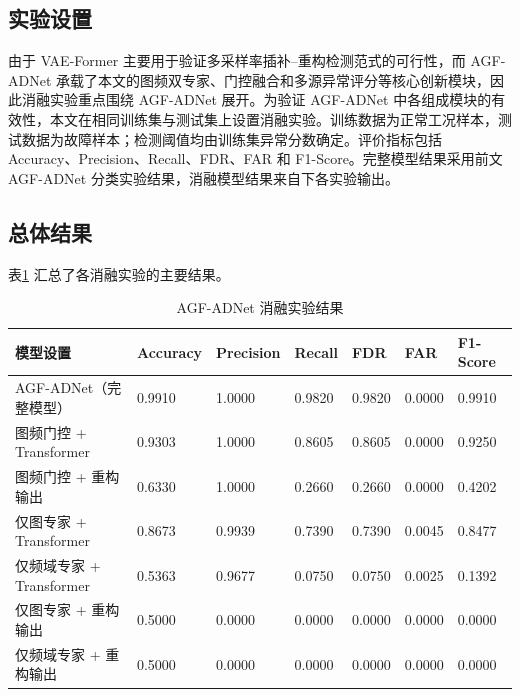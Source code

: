 \documentclass[bachelor, vlined]{DissertUESTC}
\begin{document}
    \subsection{实验设置}
    由于 VAE-Former 主要用于验证多采样率插补--重构检测范式的可行性，而 AGF-ADNet 承载了本文的图频双专家、门控融合和多源异常评分等核心创新模块，因此消融实验重点围绕 AGF-ADNet 展开。为验证 AGF-ADNet 中各组成模块的有效性，本文在相同训练集与测试集上设置消融实验。训练数据为正常工况样本，测试数据为故障样本；检测阈值均由训练集异常分数确定。评价指标包括 Accuracy、Precision、Recall、FDR、FAR 和 F1-Score。完整模型结果采用前文 AGF-ADNet 分类实验结果，消融模型结果来自下各实验输出。

    \subsection{总体结果}

    表\ref{tab:mra_ablation_results} 汇总了各消融实验的主要结果。

    \begin{table}[!htbp]
        \centering
        \caption{AGF-ADNet 消融实验结果}
        \label{tab:mra_ablation_results}
        \begin{tabular}{p{4.1cm} p{1.4cm} p{1.3cm} p{1.1cm} p{1.1cm} p{1.1cm} p{1.5cm}}
            \toprule
            \textbf{模型设置} & \textbf{Accuracy} & \textbf{Precision} & \textbf{Recall} & \textbf{FDR} & \textbf{FAR} & \textbf{F1-Score} \\
            \midrule
            AGF-ADNet（完整模型） & 0.9910 & 1.0000 & 0.9820 & 0.9820 & 0.0000 & 0.9910 \\
            图频门控 + Transformer & 0.9303 & 1.0000 & 0.8605 & 0.8605 & 0.0000 & 0.9250 \\
            图频门控 + 重构输出 & 0.6330 & 1.0000 & 0.2660 & 0.2660 & 0.0000 & 0.4202 \\
            仅图专家 + Transformer & 0.8673 & 0.9939 & 0.7390 & 0.7390 & 0.0045 & 0.8477 \\
            仅频域专家 + Transformer & 0.5363 & 0.9677 & 0.0750 & 0.0750 & 0.0025 & 0.1392 \\
            仅图专家 + 重构输出 & 0.5000 & 0.0000 & 0.0000 & 0.0000 & 0.0000 & 0.0000 \\
            仅频域专家 + 重构输出 & 0.5000 & 0.0000 & 0.0000 & 0.0000 & 0.0000 & 0.0000 \\
            \bottomrule
        \end{tabular}
    \end{table}
\end{document}
